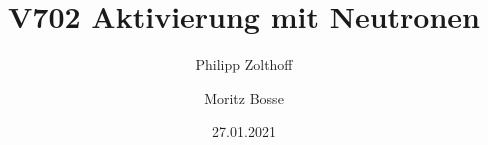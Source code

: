 

\author{Philipp Zolthoff \and Moritz Bosse}
\title{V702 Aktivierung mit Neutronen}
\date{27.01.2021}



\maketitle
\tableofcontents

\ignorespacesafterend
\newpage








\printbibliography



